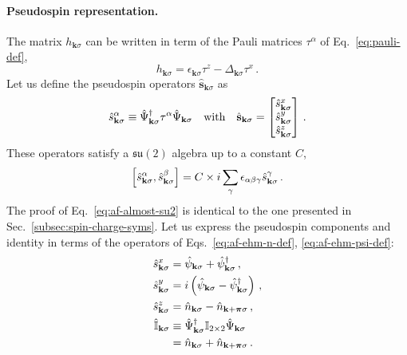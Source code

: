 \paragraph{Pseudospin representation.} The matrix $h_{\mathbf{k}\sigma}$ can be written in term of the Pauli matrices $\tau^\alpha$ of Eq.~\eqref{eq:pauli-def},
\[
h_{\mathbf{k}\sigma} = \epsilon_{\mathbf{k}\sigma} \tau^z - \Delta_{\mathbf{k}\sigma} \tau^x \, .
\]
Let us define the pseudospin operators $\hat{\mathbf{s}}_{\mathbf{k}\sigma}$ as
\begin{equation}\label{eq:af-pseudospin-def}
	\hat s_{\mathbf{k}\sigma}^\alpha \equiv \hat \Psi_{\mathbf{k}\sigma}^\dagger \tau^\alpha \hat \Psi_{\mathbf{k}\sigma}
	\qq{with}
	\hat{\mathbf{s}}_{\mathbf{k}\sigma} = \begin{bmatrix}
		\hat s_{\mathbf{k}\sigma}^x \\
		\hat s_{\mathbf{k}\sigma}^y \\
		\hat s_{\mathbf{k}\sigma}^z
	\end{bmatrix} \, .
\end{equation}
These operators satisfy a $\mathfrak{su}(2)$ algebra up to a constant $C$,
\begin{equation}\label{eq:af-almost-su2}
	\comm{\hat s_{\mathbf{k}\sigma}^\alpha}{\hat s_{\mathbf{k}\sigma}^\beta} = C \times i\sum_\gamma \epsilon_{\alpha\beta\gamma} \hat s_{\mathbf{k}\sigma}^\gamma \, .
\end{equation}
The proof of Eq.~\eqref{eq:af-almost-su2} is identical to the one presented in Sec.~\ref{subsec:spin-charge-syms}. Let us express the pseudospin components and identity in terms of the operators of Eqs.~\eqref{eq:af-ehm-n-def}, \eqref{eq:af-ehm-psi-def}:
\begin{align}
	\hat s_{\mathbf{k}\sigma}^x &= \hat \psi_{\mathbf{k}\sigma} + \hat \psi_{\mathbf{k}\sigma}^\dagger \, , \label{eq:af-hm-x-psi} \\
	\hat s_{\mathbf{k}\sigma}^y &= i \left(
	\hat \psi_{\mathbf{k}\sigma} - \hat \psi_{\mathbf{k}\sigma}^\dagger 
	\right) \, ,\label{eq:af-hm-y-psi} \\
	\hat s_{\mathbf{k}\sigma}^z &= \hat n_{\mathbf{k}\sigma} - \hat n_{\mathbf{k}+\bm{\pi}\sigma} \, , \label{eq:af-hm-z-psi} \\
	\hat {\mathbb{I}}_{\mathbf{k}\sigma} &\equiv \hat \Psi_{\mathbf{k}\sigma}^\dagger \mathbb{I}_{2\times2} \hat \Psi_{\mathbf{k}\sigma} \nonumber \\
	&= \hat n_{\mathbf{k}\sigma} + \hat n_{\mathbf{k}+\bm{\pi}\sigma} \, . \label{eq:af-hm-id-def}
\end{align}
